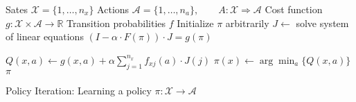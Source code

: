 \documentclass{article}
\begin{document}
\begin{preview}
    \begin{algorithm}[H]
        \begin{algorithmic}
        \Require
        \Statex Sates $\mathcal{X} = \{1, \dots, n_x\}$
        \Statex Actions $\mathcal{A} = \{1, \dots, n_a\},\qquad A: \mathcal{X} \Rightarrow \mathcal{A}$
        \Statex Cost function $g: \mathcal{X} \times \mathcal{A} \rightarrow \mathbb{R}$
        \Statex Transition probabilities $f$
            \State Initialize $\pi$ arbitrarily
                \State $J \gets$ solve system of linear equations $(I - \alpha \cdot F(\pi)) \cdot J = g(\pi)$

                        \State $Q(x, a) \gets g(x, a) + \alpha \sum_{j=1}^{n_x} f_{xj}(a) \cdot J(j)$
                    \EndFor
                \EndFor
                    \State $\pi(x) \gets \arg \min_a \{Q(x, a)\}$
                \EndFor
            \EndWhile
            \Return $\pi$
        \EndProcedure
        \end{algorithmic}
    \caption{Policy Iteration: Learning a policy $\pi: \mathcal{X} \rightarrow \mathcal{A}$}
    \label{alg:policy-iteration}
    \end{algorithm}
\end{preview}
\end{document}
